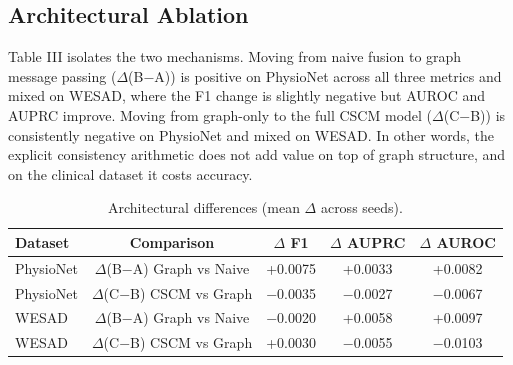 \documentclass[conference]{IEEEtran}
\begin{document}
\subsection{Architectural Ablation}
Table III isolates the two mechanisms. Moving from naive fusion to graph message passing ($\Delta$(B$-$A)) is positive on PhysioNet across all three metrics and mixed on WESAD, where the F1 change is slightly negative but AUROC and AUPRC improve. Moving from graph-only to the full CSCM model ($\Delta$(C$-$B)) is consistently negative on PhysioNet and mixed on WESAD. In other words, the explicit consistency arithmetic does not add value on top of graph structure, and on the clinical dataset it costs accuracy.
\begin{table}[t]
\caption{Architectural differences (mean $\Delta$ across seeds).}
\label{tab:8}
\centering
\small
\begin{tabular}{lcccc}
\toprule
Dataset & Comparison & $\Delta$ F1 & $\Delta$ AUPRC & $\Delta$ AUROC \\
\midrule
PhysioNet & $\Delta$(B$-$A) Graph vs Naive & +0.0075 & +0.0033 & +0.0082 \\
PhysioNet & $\Delta$(C$-$B) CSCM vs Graph & $-$0.0035 & $-$0.0027 & $-$0.0067 \\
WESAD & $\Delta$(B$-$A) Graph vs Naive & $-$0.0020 & +0.0058 & +0.0097 \\
WESAD & $\Delta$(C$-$B) CSCM vs Graph & +0.0030 & $-$0.0055 & $-$0.0103 \\
\bottomrule
\end{tabular}
\end{table}
\end{document}
